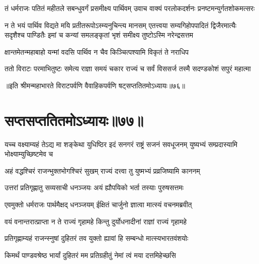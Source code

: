 
\fourlineindentedshloka
{तं धर्मराजः पतितं महीतले}
{सबन्धुवर्गं प्रसमीक्ष्य पार्थिवम्}
{उवाच वाक्यं परलोकदर्शनः}
{प्रनष्टमन्युर्गतशोकमत्सरः}


\sixlineindentedshloka
{न ते भयं पार्थिव विद्यते मयि}
{प्रतीतरूपोऽस्म्यनुचिन्त्य मानसम्}
{एतत्त्वया सम्यगिहोपपादितं}
{द्विजैरमात्यैः सदृशैश्च पाण्डितैः}
{इमां च कन्यां समलङ्कृतां भृशं}
{समीक्ष्य तुष्टोऽस्मि नरेन्द्रसत्तम}


\twolineshloka
{क्षान्तमेतन्महाबाहो यन्मां वदसि पार्थिव}
{न चैव किञ्चित्पश्यामि विकृतं ते नराधिप}



\fourlineindentedshloka
{ततो विराटः परमाभितुष्टः}
{समेत्य राज्ञा समयं चकार}
{राज्यं च सर्वं विससर्ज तस्मै}
{सदण्डकोशं सपुरं महात्मा}

॥इति श्रीमन्महाभारते विराटपर्वणि वैवाहिकपर्वणि षट्सप्ततितमोऽध्यायः॥७६॥

\chapter{सप्तसप्ततितमोऽध्यायः॥७७॥}

\threelineshloka
{यच्च वक्ष्याम्यहं तेऽद्य मा शङ्केथा युधिष्ठिर}
{इदं सनगरं राष्ट्रं सजनं सवधूजनम्}
{युष्यभ्यं सम्प्रदास्यामि भोक्ष्याम्युच्छिष्टमेव च}


\twolineshloka
{अहं वद्धश्चिरं राजन्भुक्तभोगश्चिरं सुखम्}
{राज्यं दत्त्वा तु युष्मभ्यं प्रव्रजिष्यामि काननम्}


\twolineshloka
{उत्तरां प्रतिगृह्णातु सव्यसाची धनञ्जयः}
{अयं ह्यौपयिको भर्ता तस्याः पुरुषसत्तमः}



\twolineshloka
{एवमुक्तो धर्मराजः पार्थमैक्षद् धनञ्जयम्}
{ईक्षितं चार्जुनो ज्ञात्वा मात्स्यं वचनमब्रवीत्}


\twolineshloka
{वयं वनान्तरात्प्राप्ता न ते राज्यं गृहामहे}
{किन्तु दुर्योधनादीनां राज्ञां राज्यं गृहामहे}


\twolineshloka
{प्रतिगृह्णाम्यहं राजन्स्नुषां दुहितरं तव}
{युक्तो ह्यावां हि सम्बन्धो मात्स्यभारतवंशयोः}




\twolineshloka
{किमर्थं पाण्डवश्रेष्ठ भार्यां दुहितरं मम}
{प्रतिग्रहीतुं नेमां त्वं मया दत्तमिहेच्छसि}




